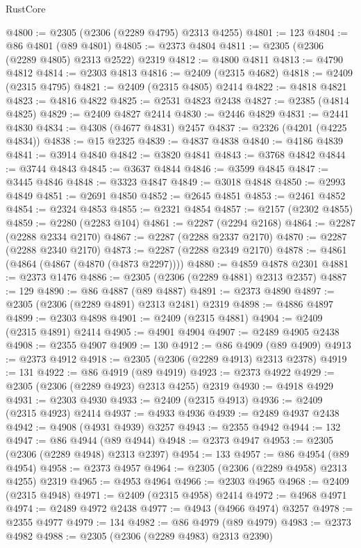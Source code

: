 \begin{lexlean}{RustCore}
\begin{coremodule}
@4800 := @2305 (@2306 (@2289 @4795) @2313 @4255)
@4801 := 123
@4804 := @86 @4801 (@89 @4801)
@4805 := @2373 @4804
@4811 := @2305 (@2306 (@2289 @4805) @2313 @2522) @2319
@4812 := @4800 @4811
@4813 := @4790 @4812
@4814 := @2303 @4813
@4816 := @2409 (@2315 @4682)
@4818 := @2409 (@2315 @4795)
@4821 := @2409 (@2315 @4805) @2414
@4822 := @4818 @4821
@4823 := @4816 @4822
@4825 := @2531 @4823 @2438
@4827 := @2385 (@4814 @4825)
@4829 := @2409 @4827 @2414
@4830 := @2446 @4829
@4831 := @2441 @4830
@4834 := @4308 (@4677 @4831) @2457
@4837 := @2326 (@4201 (@4225 @4834))
@4838 := @15 @2325
@4839 := @4837 @4838
@4840 := @4186 @4839
@4841 := @3914 @4840
@4842 := @3820 @4841
@4843 := @3768 @4842
@4844 := @3744 @4843
@4845 := @3637 @4844
@4846 := @3599 @4845
@4847 := @3445 @4846
@4848 := @3323 @4847
@4849 := @3018 @4848
@4850 := @2993 @4849
@4851 := @2691 @4850
@4852 := @2645 @4851
@4853 := @2461 @4852
@4854 := @2324 @4853
@4855 := @2321 @4854
@4857 := @2157 (@2302 @4855)
@4859 := @2280 (@2283 @104)
@4861 := @2287 (@2294 @2168)
@4864 := @2287 (@2288 @2334 @2170)
@4867 := @2287 (@2288 @2337 @2170)
@4870 := @2287 (@2288 @2340 @2170)
@4873 := @2287 (@2288 @2349 @2170)
@4878 := @4861 (@4864 (@4867 (@4870 (@4873 @2297))))
@4880 := @4859 @4878 @2301
@4881 := @2373 @1476
@4886 := @2305 (@2306 (@2289 @4881) @2313 @2357)
@4887 := 129
@4890 := @86 @4887 (@89 @4887)
@4891 := @2373 @4890
@4897 := @2305 (@2306 (@2289 @4891) @2313 @2481) @2319
@4898 := @4886 @4897
@4899 := @2303 @4898
@4901 := @2409 (@2315 @4881)
@4904 := @2409 (@2315 @4891) @2414
@4905 := @4901 @4904
@4907 := @2489 @4905 @2438
@4908 := @2355 @4907
@4909 := 130
@4912 := @86 @4909 (@89 @4909)
@4913 := @2373 @4912
@4918 := @2305 (@2306 (@2289 @4913) @2313 @2378)
@4919 := 131
@4922 := @86 @4919 (@89 @4919)
@4923 := @2373 @4922
@4929 := @2305 (@2306 (@2289 @4923) @2313 @4255) @2319
@4930 := @4918 @4929
@4931 := @2303 @4930
@4933 := @2409 (@2315 @4913)
@4936 := @2409 (@2315 @4923) @2414
@4937 := @4933 @4936
@4939 := @2489 @4937 @2438
@4942 := @4908 (@4931 @4939) @3257
@4943 := @2355 @4942
@4944 := 132
@4947 := @86 @4944 (@89 @4944)
@4948 := @2373 @4947
@4953 := @2305 (@2306 (@2289 @4948) @2313 @2397)
@4954 := 133
@4957 := @86 @4954 (@89 @4954)
@4958 := @2373 @4957
@4964 := @2305 (@2306 (@2289 @4958) @2313 @4255) @2319
@4965 := @4953 @4964
@4966 := @2303 @4965
@4968 := @2409 (@2315 @4948)
@4971 := @2409 (@2315 @4958) @2414
@4972 := @4968 @4971
@4974 := @2489 @4972 @2438
@4977 := @4943 (@4966 @4974) @3257
@4978 := @2355 @4977
@4979 := 134
@4982 := @86 @4979 (@89 @4979)
@4983 := @2373 @4982
@4988 := @2305 (@2306 (@2289 @4983) @2313 @2390)

\end{coremodule}
\end{lexlean}

